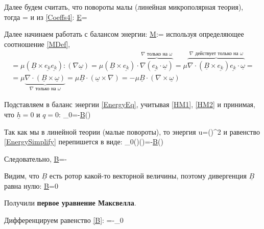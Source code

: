 \documentclass[main.tex]{subfiles}
\begin{document}
Далее будем считать, что повороты малы (линейная микрополярная теория), тогда
\beq
\underline{\omega}=
\eeq
и из \eqref{Coeffs4}:
\beq\label{E}
\underline{E}=
\eeq

Далее начинаем работать с балансом энергии:
\beq
\underline{\underline{M}}:\nabla\underline{\omega}=
\eeq
используя определяющее соотношение \eqref{MDef},
\begin{multline}
=\mu\left(\underline{B}\times\underline{e_k}\underline{e_k}\right):\left(\nabla\underline{\omega}\right)=\mu\left(\underline{B}\times\underline{e_k}\right)\cdot\overbrace{\nabla\left(\underline{e_k}\cdot\underline{\omega}\right)}^{\nabla\text{ только на }\omega}=\mu\overbrace{\nabla\cdot\left(\underline{B}\times\underline{e_k}\right)\underline{e_k}\cdot\underline{\omega}}^{\nabla\text{ действует только на }\omega}=\\=\mu\underbrace{\nabla\cdot\left(\underline{B}\times\underline{\omega}\right)}_{\nabla\text{ только на }\omega}=\mu\underline{B}\cdot\left(\underline{\omega}\times\nabla\right)=-\mu\underline{B}\cdot\left(\nabla\times\underline{\omega}\right)
\end{multline}

Подставляем в баланс энергии \eqref{EnergyEq}, учитывая \eqref{HM1}, \eqref{HM2} и принимая, что $\underline{h}=0$ и $q=0$:
\beq\label{EnergySimplify}
\rho_0=-\mu\underline{B}\cdot\left(\nabla\times{}\right)
\eeq

Так как мы в линейной теории (малые повороты), то энергия
\beq
u=\kappa\left(\nabla\times\underline{\theta}\right)^2
\eeq 
и равенство \eqref{EnergySimplify} перепишется в виде:
\beq
\rho_0\kappa\left(\nabla\times\underline{\theta}\right)\cdot{}\left(\nabla\times\underline{\theta}\right)=-\mu\underline{B}\cdot{}\left(\nabla\times\underline{\theta}\right)
\eeq

Следовательно,
\beq\label{B}
\underline{B}=-\frac{\rho_0\kappa}{\mu}\nabla\times\underline{\theta}
\eeq

Видим, что $\underline{B}$ есть ротор какой-то векторной величины, поэтому дивергенция $\underline{B}$ равна нулю:
\beq
\nabla\cdot\underline{B}=0
\eeq

Получили \textbf{первое уравнение Максвелла}.

Дифференцируем равенство \eqref{B}:
\beq\label{Help1}
=-\rho_0\frac{\kappa}{\mu}\nabla\times{}
\eeq
\end{document}
